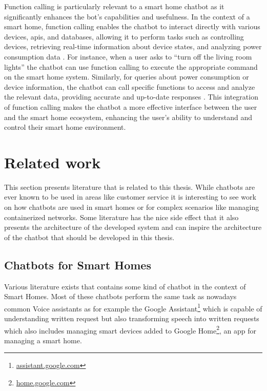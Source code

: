 Function calling is particularly relevant to a smart home chatbot as it significantly enhances the bot's capabilities and usefulness. In the context of a smart home, function calling enables the chatbot to interact directly with various devices, \glspl{api}, and databases, allowing it to perform tasks such as controlling devices, retrieving real-time information about device states, and analyzing power consumption data \cite{google2024function}. For instance, when a user asks to ``turn off the living room lights'' the chatbot can use function calling to execute the appropriate command on the smart home system. Similarly, for queries about power consumption or device information, the chatbot can call specific functions to access and analyze the relevant data, providing accurate and up-to-date responses \cite{mistral2024function, openai2024function-article}. This integration of function calling makes the chatbot a more effective interface between the user and the smart home ecosystem, enhancing the user's ability to understand and control their smart home environment.

\newpage
\section{Related work}
This section presents literature that is related to this thesis.
While chatbots are ever known to be used in areas like customer service it is interesting to see work on how chatbots are used in smart homes or for complex scenarios like managing containerized networks.
Some literature has the nice side effect that it also presents the architecture of the developed system and can inspire the architecture of the chatbot that should be developed in this thesis.

\subsection{Chatbots for Smart Homes}
Various literature exists that contains some kind of chatbot in the context of Smart Homes.
Most of these chatbots perform the same task as nowadays common Voice assistants as for example the Google Assistant\footnote{\href{https://assistant.google.com/}{assistant.google.com}} which is capable of understanding written request but also transforming speech into written requests which also includes managing smart devices added to Google Home\footnote{\href{https://home.google.com/intl/de_de/the-latest/}{home.google.com}}, an app for managing a smart home.

